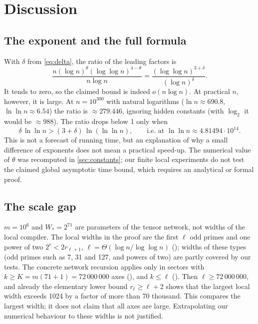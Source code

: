\documentclass[11pt]{article}
\theoremstyle{plain}
\begin{document}
\section{Discussion}\label{sec:discussion}

\subsection{The exponent and the full formula}\label{sec:disc-theta}
With $\delta$ from \eqref{eq:delta}, the ratio of the leading factors is
\begin{equation}\label{eq:ratio}
\frac{n(\log n)^{\theta}(\log\log n)^{4-\theta}}{n\log n}=\frac{(\log\log n)^{3+\delta}}{(\log n)^{\delta}} .
\end{equation}
It tends to zero, so the claimed bound is indeed $o(n\log n)$. At practical $n$, however, it is large. At $n=10^{300}$ with natural logarithms ($\ln n\approx690.8$, $\ln\ln n\approx6.54$) the ratio is $\approx279.446$, ignoring hidden constants (with $\log_2$ it would be $\approx988$). The ratio drops below 1 only when
\begin{equation}\label{eq:crossover}
\delta\,\ln\ln n>(3+\delta)\,\ln(\ln\ln n),\qquad\text{i.e.\ at }\ln\ln n\approx4.81494\cdot10^{14}.
\end{equation}
This is not a forecast of running time, but an explanation of why a small difference of exponents does not mean a practical speed-up. The numerical value of $\theta$ was recomputed in \cref{sec:constants}; our finite local experiments do not test the claimed global asymptotic time bound, which requires an analytical or formal proof.

\subsection{The scale gap}\label{sec:disc-scale}
$m=10^6$ and $W_*=2^{71}$ are parameters of the tensor network, not widths of the local compiler. The local widths in the proof are the first $\ell$ odd primes and one power of two $2^e<2r_{\ell+1}$, $\ell=\Theta(\log n/\log\log n)$ (); widths of these types (odd primes such as 7, 31 and 127, and powers of two) are partly covered by our tests. The concrete network recursion applies only in sectors with $k\ge K=m(71+1)=72\,000\,000$ axes (), and $k\le\ell$ (). Then $\ell\ge72\,000\,000$, and already the elementary lower bound $r_\ell\ge\ell+2$ shows that the largest local width exceeds 1024 by a factor of more than 70 thousand. This compares the largest width; it does not claim that all axes are large. Extrapolating our numerical behaviour to these widths is not justified.
\end{document}
